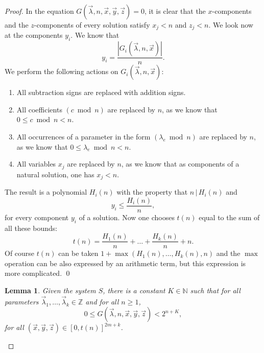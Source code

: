 \documentclass[10pt,a4paper]{article}
\theoremstyle{plain}
\newtheorem{lemma}{Lemma}[section]
\begin{document}
\begin{proof} In the equation $G(\vec \lambda, n, \vec x, \vec y, \vec z) = 0$, it is clear that the $x$-components and the $z$-components of every solution satisfy $x_j < n$ and $z_j < n$. We look now at the components $y_i$. We know that
$$y_i = \frac{|G_i(\vec \lambda, n, \vec x)|}{n}.$$
We perform the following actions on $G_i(\vec \lambda, n, \vec x)$:
\begin{enumerate}
    \item All subtraction signs are replaced with addition signs.
    \item All coefficients $(c \bmod n)$ are replaced by $n$, as we know that $0 \leq c \bmod n < n$.
    \item All occurrences of a parameter in the form $(\lambda_{e} \bmod n) $ are replaced by $n$, as we know that $0 \leq \lambda_e \bmod n < n$.
    \item All variables $x_j$ are replaced by $n$, as we know that as components of a natural solution, one has $x_j < n$. 
\end{enumerate} 
The result is a polynomial $H_i(n)$ with the property that $n \,|\,H_i(n)$ and
$$y_i \le \frac{H_i(n)}{n},$$
for every component $y_i$ of a solution. Now one chooses $t(n)$ equal to the sum of all these bounds:
$$t(n) = \frac{H_1(n)}{n}+ \dots + \frac{H_k(n)}{n} + n.$$
Of course $t(n)$ can be taken $1 + \max(H_1(n), \dots, H_k(n), n)$ and the $\max$ operation can be also expressed by an arithmetic term, but this expression is more complicated. 
\qed 

\begin{lemma}
    Given the system $S$, there is a constant $K \in \mathbb N$ such that for all parameters $\vec \lambda_1, \dots, \vec \lambda_k \in \mathbb Z$ and for all $n \geq 1$, 
    $$0 \leq G(\vec \lambda, n, \vec x, \vec y, \vec z) < 2^{n+K},$$
    for all $(\vec x, \vec y, \vec z) \in [0, t(n)]^{2m + k}$. 
\end{lemma} 


\end{proof}
\end{document}
